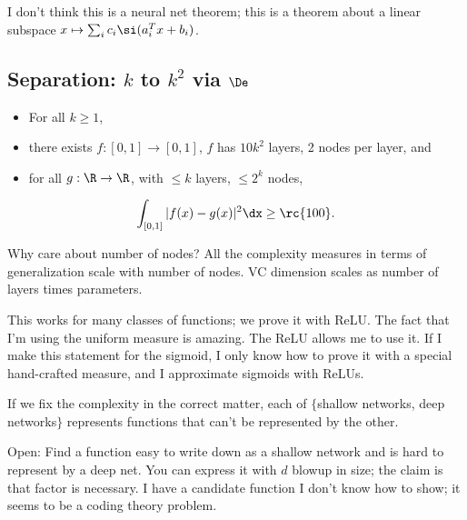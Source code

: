 I don't think this is a neural net theorem; this is a theorem about a linear subspace $x\mapsto \sum_i c_i\si(a_i^Tx+b_i)$.

\subsection{Separation: $k$ to $k^2$ via $\De$}

\begin{thm}
\begin{itemize}
\item
For all $k\ge 1$, 
\item
there exists $f:[0,1]\to [0,1]$, $f$ has $10k^2$ layers, 2 nodes per layer, and
\item
for all $g:\R\to \R$, with $\le k$ layers, $\le 2^k$ nodes, 
\end{itemize}
$$
\int_{[0,1]}|f(x)-g(x)|^2 \dx \ge \rc{100}.
$$
\end{thm}

Why care about number of nodes?
All the complexity measures in terms of generalization scale with number of nodes.
VC dimension scales as number of layers times parameters.

This works for many classes of functions; we prove it with ReLU.
The fact that I'm using the uniform measure is amazing. The ReLU allows me to use it.
 If I make this statement for the sigmoid, I only know how to prove it with a special hand-crafted measure, and I approximate sigmoids with ReLUs.

If we fix the complexity in the correct matter, each of $\{$shallow networks, deep networks$\}$ represents functions that can't be represented by the other.

Open: Find a function easy to write down as a shallow network and is hard to represent by a deep net. You can express it with $d$ blowup in size; the claim is that factor is necessary. I have a candidate function I don't know how to show; it seems to be  a coding theory problem.

